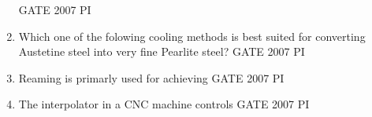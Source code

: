 \documentclass[journal,12pt,onecolumn]{IEEEtran}
\theoremstyle{remark}
\begin{document}
\begin{enumerate}
    \hfill{GATE 2007 PI}
    \begin{enumerate}
    \end{enumerate}
    
    \item
    Which one of the folowing cooling methods is best suited for converting Austetine steel into very fine Pearlite steel?
    \hfill{GATE 2007 PI} 
    \begin{enumerate}
        \end{enumerate}
        
        \item
        Reaming is primarly used for achieving
        \hfill{GATE 2007 PI}
        \begin{enumerate}
        \end{enumerate}
        
        \item 
        The interpolator in a CNC machine controls
        \hfill{GATE 2007 PI}
        \begin{enumerate}
        \end{enumerate}
        

\end{enumerate}
\end{document}
